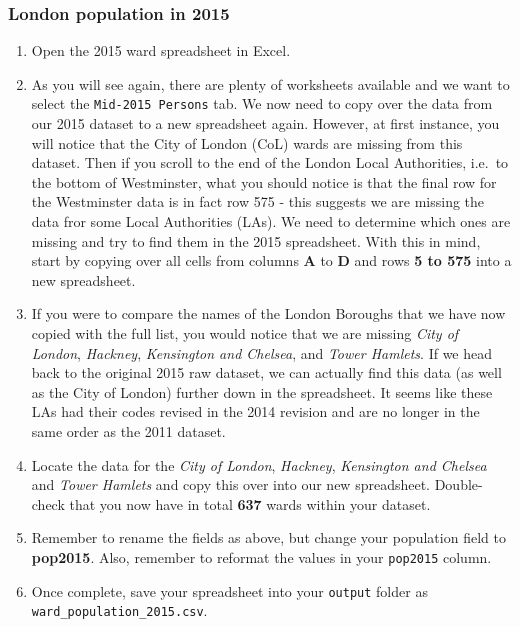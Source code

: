 \documentclass[
]{book}
\providecommand{\tightlist}{%
  \setlength{\itemsep}{0pt}\setlength{\parskip}{0pt}}
\begin{document}
\hypertarget{london-population-in-2015}{%
\subsubsection{London population in 2015}\label{london-population-in-2015}}

\begin{enumerate}
\def\labelenumi{\arabic{enumi}.}
\tightlist
\item
  Open the 2015 ward spreadsheet in Excel.
\item
  As you will see again, there are plenty of worksheets available and we want to select the \texttt{Mid-2015\ Persons} tab. We now need to copy over the data from our 2015 dataset to a new spreadsheet again. However, at first instance, you will notice that the City of London (CoL) wards are missing from this dataset. Then if you scroll to the end of the London Local Authorities, i.e.~to the bottom of Westminster, what you should notice is that the final row for the Westminster data is in fact row 575 - this suggests we are missing the data fror some Local Authorities (LAs). We need to determine which ones are missing and try to find them in the 2015 spreadsheet. With this in mind, start by copying over all cells from columns \textbf{A} to \textbf{D} and rows \textbf{5 to 575} into a new spreadsheet.
\item
  If you were to compare the names of the London Boroughs that we have now copied with the full list, you would notice that we are missing \emph{City of London}, \emph{Hackney}, \emph{Kensington and Chelsea}, and \emph{Tower Hamlets}. If we head back to the original 2015 raw dataset, we can actually find this data (as well as the City of London) further down in the spreadsheet. It seems like these LAs had their codes revised in the 2014 revision and are no longer in the same order as the 2011 dataset.
\item
  Locate the data for the \emph{City of London}, \emph{Hackney}, \emph{Kensington and Chelsea} and \emph{Tower Hamlets} and copy this over into our new spreadsheet. Double-check that you now have in total \textbf{637} wards within your dataset.
\item
  Remember to rename the fields as above, but change your population field to \textbf{pop2015}. Also, remember to reformat the values in your \texttt{pop2015} column.
\item
  Once complete, save your spreadsheet into your \texttt{output} folder as \texttt{ward\_population\_2015.csv}.
\end{enumerate}
\end{document}
